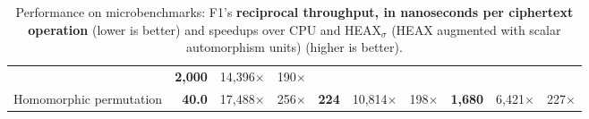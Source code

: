 {\begin{table*}[b]
\begin{normalsize}
\begin{center}
\begin{tabular}{l|rrr|rrr|rrr}
        &\textbf{2,000} %
        &14,396$\times$ %
        &190$\times$ %
        \\


        Homomorphic permutation
        &\textbf{40.0} %
        &17,488$\times$ %
        &256$\times$ %

        &\textbf{224} %
        &10,814$\times$ %
        &198$\times$ %

        &\textbf{1,680} %
        &6,421$\times$ %
        &227$\times$ %
        \\
        
        \bottomrule
      \end{tabular}
      \end{center}
      \caption{Performance on microbenchmarks: F1's \textbf{reciprocal throughput, in nanoseconds per ciphertext operation} (lower is better) and speedups over CPU and HEAX$_\sigma$ (HEAX augmented with scalar automorphism units) (higher is better).}
      \label{tbl:f1microbenchmark}
    \end{normalsize}
  \end{table*}
}


